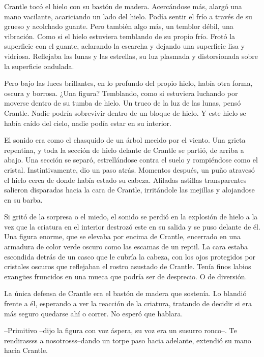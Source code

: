 Crantle tocó el hielo con su bastón de madera. Acercándose más, alargó una mano vacilante, acariciando un lado del hielo. Podía sentir el frío a través de su grueso y acolchado guante. Pero también algo más, un temblor débil, una vibración. Como si el hielo estuviera temblando de su propio frío. Frotó la superficie con el guante, aclarando la escarcha y dejando una superficie lisa y vidriosa. Reflejaba las lunas y las estrellas, su luz plasmada y distorsionada sobre la superficie ondulada.



Pero bajo las luces brillantes, en lo profundo del propio hielo, había otra forma, oscura y borrosa. ¿Una figura? Temblando, como si estuviera luchando por moverse dentro de su tumba de hielo. Un truco de la luz de las lunas, pensó Crantle. Nadie podría sobrevivir dentro de un bloque de hielo. Y este hielo se había caído del cielo, nadie podía estar en su interior.



El sonido era como el chasquido de un árbol mecido por el viento. Una grieta repentina, y toda la sección de hielo delante de Crantle se partió, de arriba a abajo. Una sección se separó, estrellándose contra el suelo y rompiéndose como el cristal. Instintivamente, dio un paso atrás. Momentos después, un puño atravesó el hielo cerca de donde había estado su cabeza. Afiladas astillas transparentes salieron disparadas hacia la cara de Crantle, irritándole las mejillas y alojandose en su barba.



Si gritó de la sorpresa o el miedo, el sonido se perdió en la explosión de hielo a la vez que la criatura en el interior destrozó este en su salida y se puso delante de él. Una figura enorme, que se elevaba por encima de Crantle, encerrado en una armadura de color verde oscuro como las escamas de un reptil. La cara estaba escondida detrás de un casco que le cubría la cabeza, con los ojos protegidos por cristales oscuros que reflejaban el rostro asustado de Crantle. Tenía finos labios exangües fruncidos en una mueca que podría ser de desprecio. O de diversión.



La única defensa de Crantle era el bastón de madera que sostenía. Lo blandió frente a él, esperando a ver la reacción de la criatura, tratando de decidir si era más seguro quedarse ahí o correr. No esperó que hablara.



--Primitivo --dijo la figura con voz áspera, su voz era un susurro ronco--. Te rendirassss a nosotrosss--dando un torpe paso hacia adelante, extendió su mano hacia Crantle.



